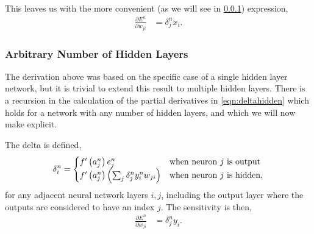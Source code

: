 \documentclass[thesis]{subfiles}
\begin{document}
This leaves us with the more convenient (as we will see in \cref{arbitraryhidden}) expression,
\begin{equation}
\begin{aligned}
    \frac{\partial E^n}{\partial w_{ji}} &=  \delta^n_j x_i.
     \label{eqn:twolayer4}
\end{aligned}
\end{equation}

\subsubsection{Arbitrary Number of Hidden Layers}
\label{arbitraryhidden}
The derivation above was based on the specific case of a single hidden layer network, but it is trivial to extend this result to multiple hidden layers. There is a recursion in the calculation of the partial derivatives in \cref{eqn:deltahidden} which holds for a network with any number of hidden layers, and which we will now make explicit. 

The delta is defined,
\begin{equation}
\delta^n_i = \begin{cases}
        f'\left( a^n_j \right) e^n_j \,& \textrm{when neuron\index{neuron} $j$ is output}\\
        f'\left( a^n_j \right) \left( \sum_j \delta^n_j y^n_i w_{ji} \right)& \textrm{when neuron\index{neuron} $j$ is hidden},
        \end{cases}
\label{eqn:fulldeltadefinition}
\end{equation}
for any adjacent neural network layers $i, j$, including the output layer where the outputs are considered to have an index $j$. The sensitivity is then, 
\begin{equation}
\begin{aligned}
    \frac{\partial E^n}{\partial w_{ji}} &=  \delta^n_j y_i.
     \label{eqn:sensitivity}
\end{aligned}
\end{equation}
\end{document}
